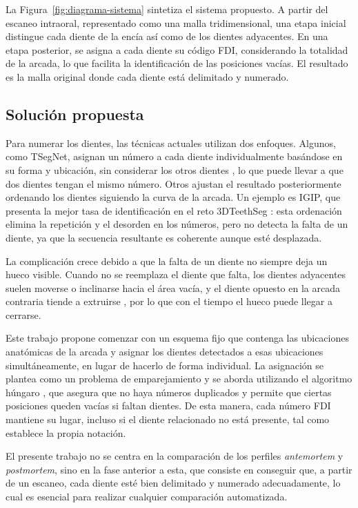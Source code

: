 La Figura~\ref{fig:diagrama-sistema} sintetiza el sistema propuesto. A partir del escaneo intraoral, representado como una malla tridimensional, una etapa inicial distingue cada diente de
la encía así como de los dientes adyacentes. En una etapa posterior, se asigna a cada diente su código FDI, considerando la totalidad de la arcada, lo que facilita la identificación de
las posiciones vacías. El resultado es la malla original donde cada diente está delimitado y numerado.

\subsection{Solución propuesta}
\label{subsec:solucion-propuesta}

Para numerar los dientes, las técnicas actuales utilizan dos enfoques. Algunos, como TSegNet, asignan un número a cada diente individualmente basándose en su forma y ubicación, sin 
considerar los otros dientes \cite{cuiTSegNetEfficientAccurate2021}, lo que puede llevar a que dos dientes tengan el mismo número. Otros ajustan el resultado posteriormente ordenando
los dientes siguiendo la curva de la arcada. Un ejemplo es IGIP, que presenta la mejor tasa de identificación en el reto 3DTeethSeg \cite{ben-hamadou3DTeethSeg223DTeeth2023}: esta 
ordenación elimina la repetición y el desorden en los números, pero no detecta la falta de un diente, ya que la secuencia resultante es coherente aunque esté desplazada.

La complicación crece debido a que la falta de un diente no siempre deja un hueco visible. Cuando no se reemplaza el diente que falta, los dientes adyacentes suelen moverse o
inclinarse hacia el área vacía, y el diente opuesto en la arcada contraria tiende a extruirse \cite{pendiente}, por lo que con el tiempo el hueco puede llegar a cerrarse.

Este trabajo propone comenzar con un esquema fijo que contenga las ubicaciones anatómicas de la arcada y asignar los dientes detectados a esas ubicaciones simultáneamente, en lugar de
hacerlo de forma individual. La asignación se plantea como un problema de emparejamiento y se aborda utilizando el algoritmo húngaro \cite{kuhnHungarianMethodAssignment1955}, que asegura
que no haya números duplicados y permite que ciertas posiciones queden vacías si faltan dientes. De esta manera, cada número FDI mantiene su lugar, incluso si el diente relacionado no
está presente, tal como establece la propia notación.

El presente trabajo no se centra en la comparación de los perfiles \textit{antemortem} y \textit{postmortem}, sino en la fase anterior a esta, que consiste en conseguir que, 
a partir de un escaneo, cada diente esté bien delimitado y numerado adecuadamente, lo cual es esencial para realizar cualquier comparación automatizada.


